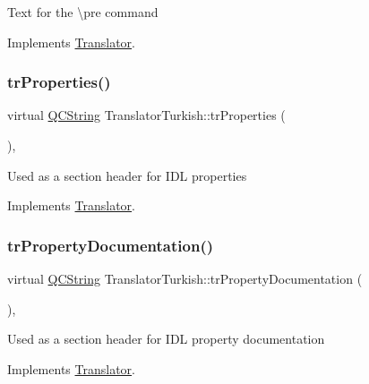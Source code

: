 Text for the \textbackslash{}pre command 

Implements \mbox{\hyperlink{class_translator}{Translator}}.

\mbox{\label{class_translator_turkish_ac8b862a24a4f329cbf8650bf051edd15}} 
\subsubsection{\texorpdfstring{trProperties()}{trProperties()}}
{\footnotesize\ttfamily virtual \mbox{\hyperlink{class_q_c_string}{Q\+C\+String}} Translator\+Turkish\+::tr\+Properties (\begin{DoxyParamCaption}{ }\end{DoxyParamCaption})\hspace{0.3cm}{\ttfamily [inline]}, {\ttfamily [virtual]}}

Used as a section header for I\+DL properties 

Implements \mbox{\hyperlink{class_translator}{Translator}}.

\mbox{\label{class_translator_turkish_a3b449d2f9bfbddcf4846116ac688b219}} 
\subsubsection{\texorpdfstring{trPropertyDocumentation()}{trPropertyDocumentation()}}
{\footnotesize\ttfamily virtual \mbox{\hyperlink{class_q_c_string}{Q\+C\+String}} Translator\+Turkish\+::tr\+Property\+Documentation (\begin{DoxyParamCaption}{ }\end{DoxyParamCaption})\hspace{0.3cm}{\ttfamily [inline]}, {\ttfamily [virtual]}}

Used as a section header for I\+DL property documentation 

Implements \mbox{\hyperlink{class_translator}{Translator}}.

\mbox{\label{class_translator_turkish_a0b8613eb194f0db017ddf688c6a00a7a}} 
